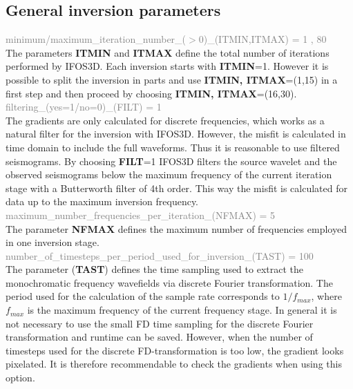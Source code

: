 \subsection{General inversion parameters}
\textcolor {Gray}{minimum/maximum\_iteration\_number\_($>$0)\_(ITMIN,ITMAX) = 1 , 80 }\vspace{0.1cm}\\
The parameters \textbf{ITMIN} and \textbf{ITMAX} define the total number of iterations performed by IFOS3D. Each inversion starts with \textbf{ITMIN}=1. However it is possible to split the inversion in parts and use \textbf{ITMIN, ITMAX}=(1,15) in a first step and then proceed by choosing \textbf{ITMIN, ITMAX}=(16,30). 
\vspace{0.3cm}\\
\textcolor {Gray}{filtering\_(yes=1/no=0)\_(FILT) = 1}\vspace{0.1cm}\\
The gradients are only calculated for discrete frequencies, which works as a natural filter for the inversion with IFOS3D. However, the misfit is calculated in time domain to include the full waveforms. Thus it is reasonable to use filtered seismograms. By choosing \textbf{FILT}=1 IFOS3D filters the source wavelet and the observed seismograms below the maximum frequency of the current iteration stage with a Butterworth filter of 4th order. This way the misfit is calculated for data up to the maximum inversion frequency.
\vspace{0.3cm}\\
\textcolor {Gray}{maximum\_number\_frequencies\_per\_iteration\_(NFMAX) = 5}\vspace{0.1cm}\\
The parameter \textbf{NFMAX} defines the maximum number of frequencies employed in one inversion stage.
\vspace{0.3cm}\\
\textcolor {Gray}{number\_of\_timesteps\_per\_period\_used\_for\_inversion\_(TAST) = 100}\vspace{0.1cm}\\
The parameter (\textbf{TAST}) defines the time sampling used to extract the monochromatic frequency wavefields via discrete Fourier transformation. The period used for the calculation of the sample rate corresponds to $1/f_{max}$, where $f_{max}$ is the maximum frequency of the current frequency stage. In general it is not necessary to use the small FD time sampling for the discrete Fourier transformation and runtime can be saved. However, when the number of timesteps used for the discrete FD-transformation is too low, the gradient looks pixelated. It is therefore recommendable to check the gradients when using this option.
